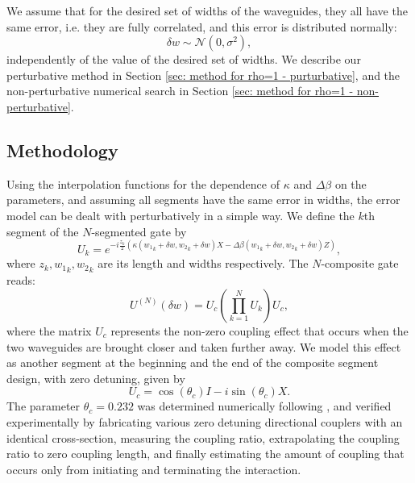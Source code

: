 \documentclass[floatfix,reprint, amsmath,amssymb,aps,superscriptaddress,nofootinbib]{revtex4-2}
\begin{document}
We assume that for the desired set of widths of the waveguides, they all have the same error, i.e. they are fully correlated, and this error is distributed normally:
\begin{equation}
\delta w \sim \mathcal{N} \left(0,\sigma^2\right),
\end{equation}
independently of the value of the desired set of widths. We describe our perturbative method in Section \ref{sec: method for rho=1 - purturbative}, and the non-perturbative numerical search in Section \ref{sec: method for rho=1 - non-perturbative}.



\subsection{Methodology\label{sec: method for rho=1}}

Using the interpolation functions for the dependence of $\kappa$ and $\Delta\beta$ on the parameters, and assuming all segments have the same error in widths, the error model can be dealt with perturbatively in a simple way.
We define the $k$th segment of the $N$-segmented gate by
\begin{equation}
 U_k = 
    e^{-i \frac{z_k}{2}\left(\kappa\left({w_1}_k+\delta w,{w_2}_k+\delta w \right) X-\Delta\beta\left({w_1}_k+\delta w,{w_2}_k+\delta w \right) Z \right)} ,
\end{equation}
where $z_k,{w_1}_k,{w_2}_k$ are its length and widths respectively.
The $N$-composite gate reads:
\begin{equation}
U^{\left(N\right)}\left(\delta w\right) = 
U_c \left(\prod_{k=1}^N U_k \right) U_c ,
\label{eq: composing2}
\end{equation}
where the matrix $U_c$ represents the non-zero coupling effect that occurs when the two waveguides are brought closer and taken further away. We model this effect as another segment at the beginning and the end of the composite segment design, with zero detuning,
given by
\begin{equation}
\label{eq:Uc}
 U_c = \cos(\theta_c) I - i \sin(\theta_c)X .
\end{equation}
The parameter $\theta_c =  0.232$ was determined numerically following \cite{EmreKaplan:19}, and verified experimentally by fabricating various zero detuning directional couplers with an identical cross-section, measuring the coupling ratio, extrapolating the coupling ratio to zero coupling length, and finally estimating the amount of coupling that occurs only from initiating and terminating the interaction.
\end{document}
